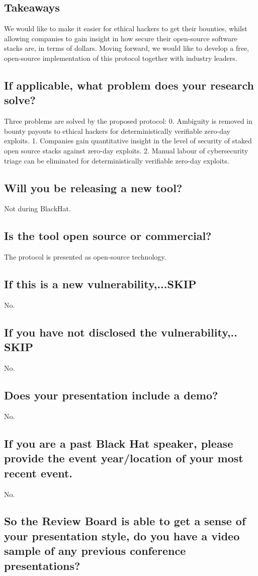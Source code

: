 \documentclass{article}
\begin{document}
\subsection{Takeaways}
We would like to make it easier for ethical hackers to get their bounties, whilst allowing companies to gain insight in how secure their open-source software stacks are, in terms of dollars. Moving forward, we would like to develop a free, open-source implementation of this protocol together with industry leaders.
\subsection{If applicable, what problem does your research solve?}
Three problems are solved by the proposed protocol:
0. Ambiguity is removed in bounty payouts to ethical hackers for deterministically verifiable zero-day exploits.
1. Companies gain quantitative insight in the level of security of staked open source stacks against zero-day exploits.
2. Manual labour of cybersecurity triage can be eliminated for deterministically verifiable zero-day exploits.
\subsection{Will you be releasing a new tool?}
Not during BlackHat.
\subsection{Is the tool open source or commercial?}
The protocol is presented as open-source technology.
\subsection{If this is a new vulnerability,...SKIP}
No.
\subsection{If you have not disclosed the vulnerability,.. SKIP}
No.
\subsection{Does your presentation include a demo?}
No.
\subsection{If you are a past Black Hat speaker, please provide the event year/location of your most recent event.}
No.
\subsection{ So the Review Board is able to get a sense of your presentation style, do you have a video sample of any previous conference presentations?}
\end{document}
